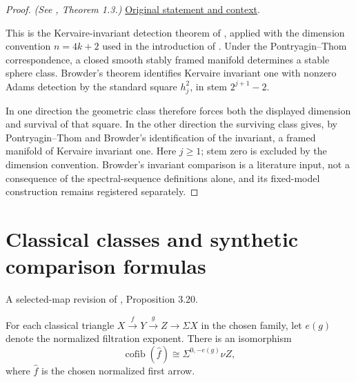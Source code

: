\begin{proof}
\textit{(See \cite{LWX126}, Theorem 1.3.)} \href{paper/main.tex.html#L117}{Original statement and context}.

This is the Kervaire-invariant detection theorem of \cite{Browder}, applied with the dimension convention $n=4k+2$ used in the introduction of \cite{LWX126}. Under the Pontryagin--Thom correspondence, a closed smooth stably framed manifold determines a stable sphere class. Browder's theorem identifies Kervaire invariant one with nonzero Adams detection by the standard square $h_j^2$, in stem $2^{j+1}-2$.

In one direction the geometric class therefore forces both the displayed dimension and survival of that square. In the other direction the surviving class gives, by Pontryagin--Thom and Browder's identification of the invariant, a framed manifold of Kervaire invariant one. Here $j\ge1$; stem zero is excluded by the dimension convention. Browder's invariant comparison is a literature input, not a consequence of the spectral-sequence definitions alone, and its fixed-model construction remains registered separately.
\end{proof}

\section{Classical classes and synthetic comparison formulas}


\begin{definition}
\label{frontier:Literature:1aa6a10db546}
A selected-map revision of \cite{LWX126}, Proposition 3.20.\par

For each classical triangle $X\xrightarrow{f}Y\xrightarrow{g}Z\to\Sigma X$ in the chosen family, let $e(g)$ denote the normalized filtration exponent. There is an isomorphism\[\operatorname{cofib}(\widehat f)\cong\Sigma^{0,-e(g)}\nu Z,\]where $\widehat f$ is the chosen normalized first arrow.
\end{definition}


